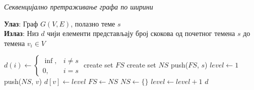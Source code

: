\begin{algorithm}[H]
\caption{\textit{Секвенцијално претраживање графа по ширини}}
\label{algorith:bfs-seq-pseudo}
\hspace*{\algorithmicindent} \textbf{Улаз}: Граф $G(V, E)$, полазно теме $s$ \\
\hspace*{\algorithmicindent} \textbf{Излаз}: Низ $d$ чији елементи представљају број скокова од почетног темена $s$ до темена $v_i \in V$
\begin{algorithmic}[1]
\State 
$d(i) \gets
\begin{cases}
\inf, &i \neq s\\
0, &i = s
\end{cases}
$
\State create set $FS$
\State create set $NS$
\State push($FS$, $s$)
\State $level \gets 1$
\State push($NS$, $v$)
\State $d[v] \gets level$
\EndIf
\EndFor
\EndFor
\State $FS \gets NS$
\State $NS \gets \{\}$
\State $level \gets level + 1$
\EndWhile
\State \Return $d$
\EndProcedure
\end{algorithmic}
\end{algorithm}